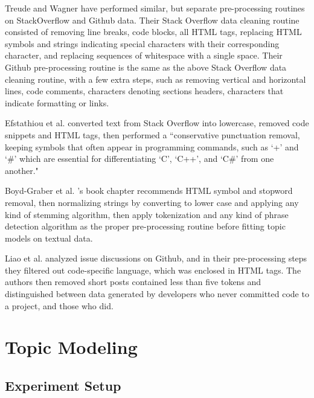 Treude and Wagner \cite{treude2019predicting} have performed similar, but separate pre-processing routines on StackOverflow and Github data. Their Stack Overflow data cleaning routine consisted of removing line breaks, code blocks, all HTML tags, replacing HTML symbols and strings indicating special characters with their corresponding character, and replacing sequences of whitespace with a single space. Their Github pre-processing routine is the same as the above Stack Overflow data cleaning routine, with a few extra steps, such as removing vertical and horizontal lines, code comments, characters denoting sections headers, characters that indicate formatting or links. 

Efstathiou et al. \cite{efstathiou2018word} converted text from Stack Overflow into lowercase, removed code snippets and HTML tags, then performed a ``conservative punctuation removal, keeping symbols that often appear in programming commands, such as ‘+’ and ‘\#’ which are essential for differentiating ‘C’, ‘C++’, and ‘C\#’ from one another."

Boyd-Graber et al. \cite{boyd2014care}'s book chapter recommends HTML symbol and  stopword removal, then normalizing strings by converting to lower case and applying any kind of stemming algorithm, then apply tokenization and any kind of phrase detection algorithm as the proper pre-processing routine before fitting topic models on textual data.

Liao et al. \cite{liao2019status} analyzed issue discussions on Github, and in their pre-processing steps they filtered out code-specific language, which was enclosed in HTML tags. The authors then removed short posts contained less than five tokens and distinguished between data generated by developers who never committed code to a project, and those who did. 




    

\section{Topic Modeling}
    
    \subsection{Experiment Setup}
    
